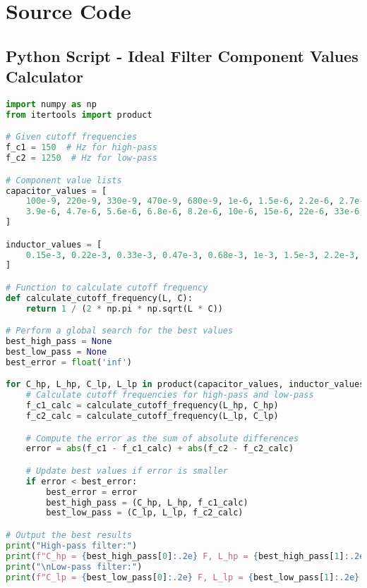 \chapter{Source Code}
\label{chapter: Code}


\section{Python Script - Ideal Filter Component Values Calculator}
\begin{lstlisting}[language=Python]
import numpy as np
from itertools import product

# Given cutoff frequencies
f_c1 = 150  # Hz for high-pass
f_c2 = 1250  # Hz for low-pass

# Component value lists
capacitor_values = [
    100e-9, 220e-9, 330e-9, 470e-9, 680e-9, 1e-6, 1.5e-6, 2.2e-6, 2.7e-6, 3.3e-6,
    3.9e-6, 4.7e-6, 5.6e-6, 6.8e-6, 8.2e-6, 10e-6, 15e-6, 22e-6, 33e-6, 47e-6, 100e-6
]

inductor_values = [
    0.15e-3, 0.22e-3, 0.33e-3, 0.47e-3, 0.68e-3, 1e-3, 1.5e-3, 2.2e-3, 3.3e-3, 4.7e-3
]

# Function to calculate cutoff frequency
def calculate_cutoff_frequency(L, C):
    return 1 / (2 * np.pi * np.sqrt(L * C))

# Perform a global search for the best values
best_high_pass = None
best_low_pass = None
best_error = float('inf')

for C_hp, L_hp, C_lp, L_lp in product(capacitor_values, inductor_values, capacitor_values, inductor_values):
    # Calculate cutoff frequencies for high-pass and low-pass
    f_c1_calc = calculate_cutoff_frequency(L_hp, C_hp)
    f_c2_calc = calculate_cutoff_frequency(L_lp, C_lp)

    # Compute the error as the sum of absolute differences
    error = abs(f_c1 - f_c1_calc) + abs(f_c2 - f_c2_calc)

    # Update best values if error is smaller
    if error < best_error:
        best_error = error
        best_high_pass = (C_hp, L_hp, f_c1_calc)
        best_low_pass = (C_lp, L_lp, f_c2_calc)

# Output the best results
print("High-pass filter:")
print(f"C_hp = {best_high_pass[0]:.2e} F, L_hp = {best_high_pass[1]:.2e} H, f_c1_actual = {best_high_pass[2]:.2f} Hz")
print("\nLow-pass filter:")
print(f"C_lp = {best_low_pass[0]:.2e} F, L_lp = {best_low_pass[1]:.2e} H, f_c2_actual = {best_low_pass[2]:.2f} Hz")
\end{lstlisting}
